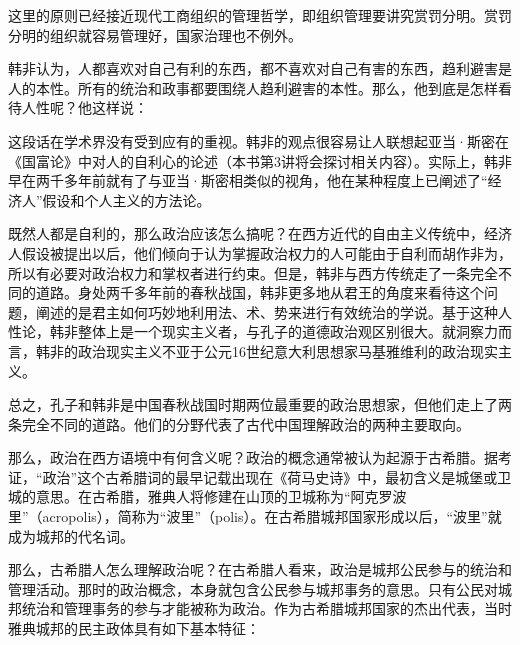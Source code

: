 
这里的原则已经接近现代工商组织的管理哲学，即组织管理要讲究赏罚分明。赏罚分明的组织就容易管理好，国家治理也不例外。

韩非认为，人都喜欢对自己有利的东西，都不喜欢对自己有害的东西，趋利避害是人的本性。所有的统治和政事都要围绕人趋利避害的本性。那么，他到底是怎样看待人性呢？他这样说：


这段话在学术界没有受到应有的重视。韩非的观点很容易让人联想起亚当·斯密在《国富论》中对人的自利心的论述（本书第3讲将会探讨相关内容）。实际上，韩非早在两千多年前就有了与亚当·斯密相类似的视角，他在某种程度上已阐述了“经济人”假设和个人主义的方法论。

既然人都是自利的，那么政治应该怎么搞呢？在西方近代的自由主义传统中，经济人假设被提出以后，他们倾向于认为掌握政治权力的人可能由于自利而胡作非为，所以有必要对政治权力和掌权者进行约束。但是，韩非与西方传统走了一条完全不同的道路。身处两千多年前的春秋战国，韩非更多地从君王的角度来看待这个问题，阐述的是君主如何巧妙地利用法、术、势来进行有效统治的学说。基于这种人性论，韩非整体上是一个现实主义者，与孔子的道德政治观区别很大。就洞察力而言，韩非的政治现实主义不亚于公元16世纪意大利思想家马基雅维利的政治现实主义。

总之，孔子和韩非是中国春秋战国时期两位最重要的政治思想家，但他们走上了两条完全不同的道路。他们的分野代表了古代中国理解政治的两种主要取向。


那么，政治在西方语境中有何含义呢？政治的概念通常被认为起源于古希腊。据考证，“政治”这个古希腊词的最早记载出现在《荷马史诗》中，最初含义是城堡或卫城的意思。在古希腊，雅典人将修建在山顶的卫城称为“阿克罗波里”（acropolis），简称为“波里”（polis）。在古希腊城邦国家形成以后，“波里”就成为城邦的代名词。

那么，古希腊人怎么理解政治呢？在古希腊人看来，政治是城邦公民参与的统治和管理活动。那时的政治概念，本身就包含公民参与城邦事务的意思。只有公民对城邦统治和管理事务的参与才能被称为政治。作为古希腊城邦国家的杰出代表，当时雅典城邦的民主政体具有如下基本特征：


